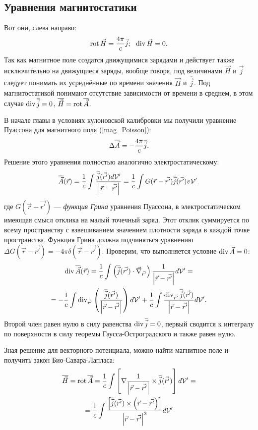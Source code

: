 \subsection{Уравнения магнитостатики}
    Вот они, слева направо:
    \[
        \operatorname{rot}\vec{H} = \frac{4\pi}{c}\vec{j}; \:\:\: \operatorname{div}\vec{H} = 0.
    \]
    Так как магнитное поле создатся движущимися зарядами и действует также исключительно на движущиеся заряды, вообще говоря,
    под величинами $\vec{H}$ и $\vec{j}$ следует понимать их усреднённые по времени значения $\overline{\vec{H}}$ и $\overline{\vec{j}}$.
    Под магнитостатикой понимают отсутствие зависимости от времени в среднем, в этом случае $\operatorname{div}\overline{\vec{j}} = 0$, $\overline{\vec{H}} = \operatorname{rot}\overline{\vec{A}}$.
    
    В начале главы в условиях кулоновской калибровки мы получили уравнение Пуассона для магнитного поля (\ref{mag_Poisson}):
    \[
        \Delta\overline{\vec{A}} = -\frac{4\pi}{c}\overline{\vec{j}}.
    \]
    Решение этого уравнения полностью аналогично электростатическому:
    \[
        \overline{\vec{A}}(\vec{r}) = \frac{1}{c}\int \frac{\overline{\vec{j}}(\vec{r'})d\mathcal{V}'}{\left|{\vec{r} - \vec{r'}}\right|} = 
        \frac 1c \int G(\vec{r} - \vec{r'})\overline{\vec{j}}(\vec{r'})v\mathcal{V}'.
    \]
    где $G(\vec{r} - \vec{r'})$ --- \textit{функция Грина} уравнения Пуассона, в электростатическом имеющая смысл отклика на малый точечный заряд.
    Этот отклик суммируется по всему пространству с взвешиванием значением плотности заряда в каждой точке пространства.
    Функция Грина должна подчиняться уравнению
    $\Delta G(\vec{r} - \vec{r'}) = -4\pi\delta(\vec{r} - \vec{r'})$.
    Проверим, что выполняется условие $\operatorname{div}\overline{\vec{A}} = 0$:
    \begin{gather*}
        \operatorname{div}\overline{\vec{A}}(\vec{r}) = \frac 1c \int \left({\overline{\vec{j}}(\vec{r'}) \cdot \vec{\nabla}_{\vec{r'}}}\right)\frac{1}{\left|{\vec{r} - \vec{r'}}\right|}d\mathcal{V}' = \\ =
        -\frac 1c \int \operatorname{div}_{\vec{r'}}\left({\frac{\overline{\vec{j}}(\vec{r'})}{\left|{\vec{r} - \vec{r'}}\right|}}\right)d\mathcal{V}' + 
        \frac 1c \int\frac{\operatorname{div}_{\vec{r'}}\overline{\vec{j}}(\vec{r'})}{\left|{\vec{r} - \vec{r'}}\right|}d\mathcal{V}'.
    \end{gather*}
    Второй член равен нулю в силу равенства $\operatorname{div}\overline{\vec{j}} = 0$, первый сводится к интегралу по поверхности в силу теоремы Гаусса-Остроградского
    и также равен нулю.

    Зная решение для векторного потенциала, можно найти магнитное поле и получить закон Био-Савара-Лапласа:
    \begin{gather*}
        \overline{\vec{H}} = \operatorname{rot}\overline{\vec{A}} = \frac 1c \int \left[{\nabla\frac{1}{\left|{\vec{r} - \vec{r'}}\right|} \times \overline{\vec{j}}(\vec{r'})}\right]d\mathcal{V}' = \\ =
        \frac 1c \int \frac{\left[{\overline{\vec{j}}(\vec{r'}) \times \left({\vec{r} - \vec{r'}}\right)}\right]}{\left|{\vec{r} - \vec{r'}}\right|^3}d\mathcal{V}'
    \end{gather*}

